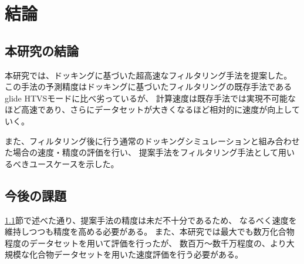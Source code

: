 \chapter{結論}
\section{本研究の結論}\label{sec:conclusion}
本研究では、ドッキングに基づいた超高速なフィルタリング手法を提案した。
この手法の予測精度はドッキングに基づいたフィルタリングの既存手法であるglide HTVSモードに比べ劣っているが、
計算速度は既存手法では実現不可能なほど高速であり、さらにデータセットが大きくなるほど相対的に速度が向上していく。

また、フィルタリング後に行う通常のドッキングシミュレーションと組み合わせた場合の速度・精度の評価を行い、
提案手法をフィルタリング手法として用いるべきユースケースを示した。

\section{今後の課題}
\ref{sec:conclusion}節で述べた通り、提案手法の精度は未だ不十分であるため、
なるべく速度を維持しつつも精度を高める必要がある。
また、本研究では最大でも数万化合物程度のデータセットを用いて評価を行ったが、
数百万～数千万程度の、より大規模な化合物データセットを用いた速度評価を行う必要がある。